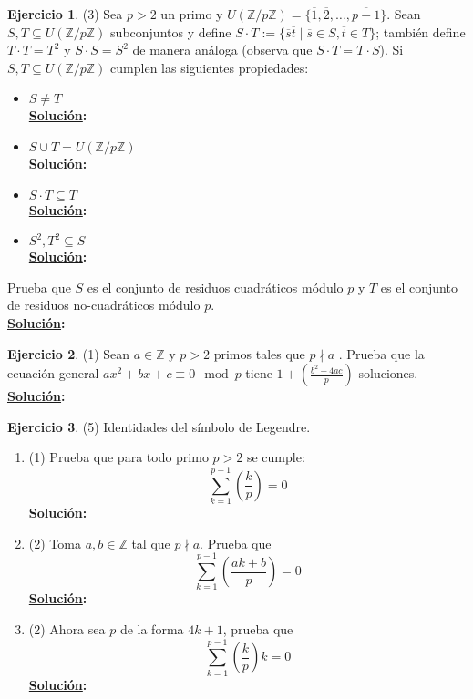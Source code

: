 \documentclass[11pt,letterpaper]{article}
\theoremstyle{definition}\newtheorem{p}{Ejercicio}
\newcommand{\Z}{\mathbb{Z}}
\newcommand{\clase}[1]{\overline{#1}}  %
\newcommand{\leg}[2]{\left( \frac{#1}{#2}\right)} %
\newcommand{\sol}{\textbf{\underline{Solución}: }} %
\begin{document}
\begin{p}(3)
Sea $p>2$ un primo y $U(\Z/p\Z)=\{\clase{1},\clase{2},\ldots,\clase{p-1}\}$. Sean
$S,T\subseteq U(\Z/p\Z)$ subconjuntos y define
$S\cdot T:=\{\clase{s}\clase{t}\mid \clase{s}\in S,\clase{t}\in T\}$; tambi\'en define
$T\cdot T=T^2$ y $S\cdot S=S^2$ de manera an\'aloga (observa que $S\cdot T=T\cdot S$). Si
$S,T\subseteq U(\Z/p\Z)$ cumplen las siguientes propiedades:
\begin{itemize}
  \item $S\neq T$\\
  \sol

  \item $S\cup T=U(\Z/p\Z)$\\
  \sol
  
  \item $S\cdot T\subseteq T$\\
  \sol
  
  \item $S^2,T^2\subseteq S$ \\
  \sol

\end{itemize}

Prueba que $S$ es el conjunto de residuos cuadr\'aticos m\'odulo $p$ y $T$ es el conjunto de
residuos no-cuadr\'aticos m\'odulo $p$.\\
\sol

\end{p}


\begin{p}(1)
Sean $a\in\Z$ y $p>2$ primos tales que $p\nmid a$ . Prueba que la ecuaci\'on general
$ax^2+bx+c\equiv 0\mod p$ tiene $1+\left(\frac{b^2-4ac}{p}\right)$ soluciones.\\
\sol

\end{p}


\begin{p}(5)
Identidades del s\'imbolo de Legendre.
\begin{enumerate}
  \item(1) Prueba que para todo primo $p>2$ se cumple:
  \[
    \sum_{k=1}^{p-1}\leg{k}{p}=0
  \]
  \sol

  \item(2) Toma $a,b\in\Z$ tal que $p\nmid a$. Prueba que
  \[
    \sum_{k=1}^{p-1}\leg{ak+b}{p}=0
  \]
  \sol

  \item(2) Ahora sea $p$ de la forma $4k+1$, prueba que
  \[
    \sum_{k=1}^{p-1}\leg{k}{p}k=0
  \]
  \sol

\end{enumerate}
\end{p}
\end{document}
